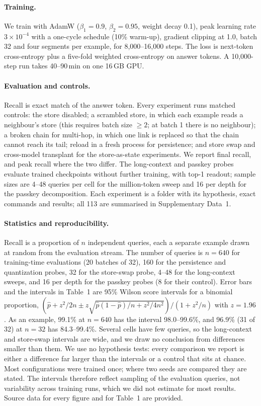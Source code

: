 \paragraph{Training.} We train with AdamW ($\beta_1=0.9$, $\beta_2=0.95$, weight decay 0.1),
peak learning rate $3\times10^{-4}$ with a one-cycle schedule (10\% warm-up), gradient
clipping at 1.0, batch 32 and four segments per example, for 8,000--16,000 steps. The
loss is next-token cross-entropy plus a five-fold weighted cross-entropy on answer tokens.
A 10,000-step run takes 40--90\,min on one 16\,GB GPU.

\paragraph{Evaluation and controls.} Recall is exact match of the answer token. Every
experiment runs matched controls: the store disabled; a scrambled store, in which each
example reads a neighbour's store (this requires batch size $\geq2$; at batch 1 there is no
neighbour); a broken chain for multi-hop, in which one link is replaced so that the chain
cannot reach its tail; reload in a fresh process for persistence; and store swap and
cross-model transplant for the store-as-state experiments. We report final recall, and peak
recall where the two differ. The long-context and passkey probes evaluate trained checkpoints
without further training, with top-1 readout; sample sizes are 4--48 queries per cell for the
million-token sweep and 16 per depth for the passkey decomposition. Each experiment is a folder with its hypothesis, exact commands and results; all 113 are summarised in Supplementary Data~1.

\paragraph{Statistics and reproducibility.} Recall is a proportion of $n$ independent queries,
each a separate example drawn at random from the evaluation stream. The number of queries is
$n=640$ for training-time evaluations (20 batches of 32), 160 for the persistence and
quantization probes, 32 for the store-swap probe, 4--48 for the long-context sweeps, and 16 per
depth for the passkey probes (8 for their control). Error bars and the intervals in Table~1 are
95\% Wilson score intervals for a binomial proportion, $\left(\hat p + z^2/2n \pm
z\sqrt{\hat p(1-\hat p)/n + z^2/4n^2}\right)/(1+z^2/n)$ with $z=1.96$. As an example, 99.1\% at
$n=640$ has the interval 98.0--99.6\%, and 96.9\% (31 of 32) at $n=32$ has 84.3--99.4\%.
Several cells have few queries, so the long-context and store-swap intervals are wide, and
we draw no conclusion from differences smaller than them. We use no hypothesis tests: every
comparison we report is either a difference far larger than the intervals or a control that
sits at chance. Most configurations were trained once; where two seeds are compared they are
stated. The intervals therefore reflect sampling of the evaluation queries, not variability
across training runs, which we did not estimate for most results. Source data for every figure
and for Table~1 are provided.

